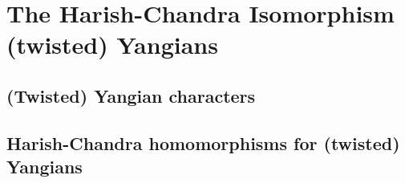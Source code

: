 \section{The Harish-Chandra Isomorphism (twisted) Yangians}
    \subsection{(Twisted) Yangian characters}

    \subsection{Harish-Chandra homomorphisms for (twisted) Yangians}